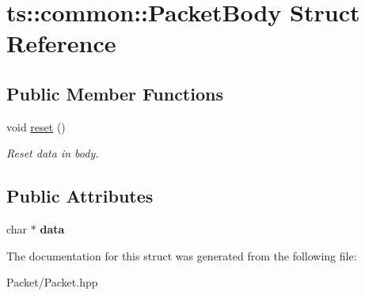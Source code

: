 \hypertarget{structts_1_1common_1_1_packet_body}{}\section{ts\+:\+:common\+:\+:Packet\+Body Struct Reference}
\label{structts_1_1common_1_1_packet_body}
\subsection*{Public Member Functions}
\begin{DoxyCompactItemize}
\item 
\mbox{\label{structts_1_1common_1_1_packet_body_a2a7de4788181d825b0187aabe71354ec}} 
void \hyperlink{structts_1_1common_1_1_packet_body_a2a7de4788181d825b0187aabe71354ec}{reset} ()
\begin{DoxyCompactList}\small\item\em Reset data in body. \end{DoxyCompactList}\end{DoxyCompactItemize}
\subsection*{Public Attributes}
\begin{DoxyCompactItemize}
\item 
\mbox{\label{structts_1_1common_1_1_packet_body_ac209e31fb1a4d1024061a4949d923ff0}} 
char $\ast$ {\bfseries data}
\end{DoxyCompactItemize}


The documentation for this struct was generated from the following file\+:\begin{DoxyCompactItemize}
\item 
Packet/Packet.\+hpp\end{DoxyCompactItemize}
